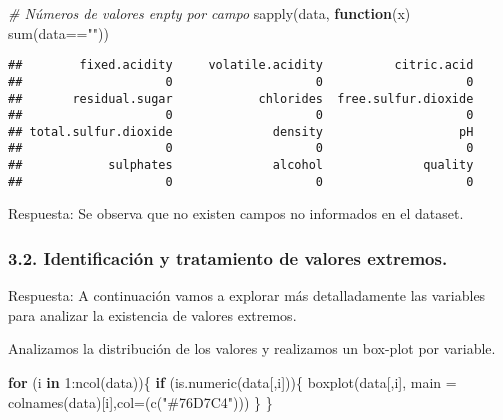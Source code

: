 \documentclass[
]{article}
\newenvironment{Shaded}{\begin{snugshade}}{\end{snugshade}}
\newcommand{\AttributeTok}[1]{\textcolor[rgb]{0.77,0.63,0.00}{#1}}
\newcommand{\CommentTok}[1]{\textcolor[rgb]{0.56,0.35,0.01}{\textit{#1}}}
\newcommand{\ControlFlowTok}[1]{\textcolor[rgb]{0.13,0.29,0.53}{\textbf{#1}}}
\newcommand{\DecValTok}[1]{\textcolor[rgb]{0.00,0.00,0.81}{#1}}
\newcommand{\FunctionTok}[1]{\textcolor[rgb]{0.00,0.00,0.00}{#1}}
\newcommand{\NormalTok}[1]{#1}
\newcommand{\SpecialCharTok}[1]{\textcolor[rgb]{0.00,0.00,0.00}{#1}}
\newcommand{\StringTok}[1]{\textcolor[rgb]{0.31,0.60,0.02}{#1}}
\begin{document}
\begin{Shaded}
\begin{Highlighting}[]
\CommentTok{\# Números de valores enpty por campo}
\FunctionTok{sapply}\NormalTok{(data, }\ControlFlowTok{function}\NormalTok{(x) }\FunctionTok{sum}\NormalTok{(data}\SpecialCharTok{==}\StringTok{""}\NormalTok{))}
\end{Highlighting}
\end{Shaded}

\begin{verbatim}
##        fixed.acidity     volatile.acidity          citric.acid 
##                    0                    0                    0 
##       residual.sugar            chlorides  free.sulfur.dioxide 
##                    0                    0                    0 
## total.sulfur.dioxide              density                   pH 
##                    0                    0                    0 
##            sulphates              alcohol              quality 
##                    0                    0                    0
\end{verbatim}

Respuesta: Se observa que no existen campos no informados en el dataset.

\hypertarget{identificaciuxf3n-y-tratamiento-de-valores-extremos.}{%
\subsubsection{3.2. Identificación y tratamiento de valores
extremos.}\label{identificaciuxf3n-y-tratamiento-de-valores-extremos.}}

Respuesta: A continuación vamos a explorar más detalladamente las
variables para analizar la existencia de valores extremos.

Analizamos la distribución de los valores y realizamos un box-plot por
variable.

\begin{Shaded}
\begin{Highlighting}[]
\ControlFlowTok{for}\NormalTok{ (i }\ControlFlowTok{in} \DecValTok{1}\SpecialCharTok{:}\FunctionTok{ncol}\NormalTok{(data))\{}
  \ControlFlowTok{if}\NormalTok{ (}\FunctionTok{is.numeric}\NormalTok{(data[,i]))\{}
  \FunctionTok{boxplot}\NormalTok{(data[,i], }\AttributeTok{main =} \FunctionTok{colnames}\NormalTok{(data)[i],}\AttributeTok{col=}\NormalTok{(}\FunctionTok{c}\NormalTok{(}\StringTok{"\#76D7C4"}\NormalTok{)))}
\NormalTok{  \}}
\NormalTok{\}}
\end{Highlighting}
\end{Shaded}
\end{document}
